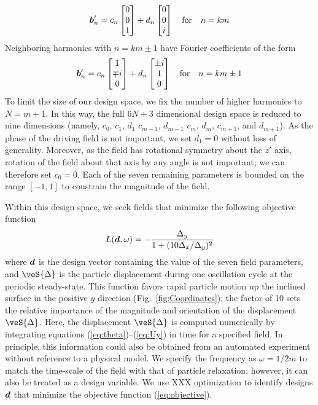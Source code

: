 \begin{equation}
    \boldsymbol{b}'_{n} = c_{n} \begin{bmatrix} 0\\0\\1 \end{bmatrix} + d_{n} \begin{bmatrix} 0\\0\\i \end{bmatrix} \quad \text{for} \quad n=km
\end{equation}
Neighboring harmonics with $n=km\pm 1$ have Fourier coefficients of the form
\begin{equation}
    \boldsymbol{b}'_{n} = c_{n} \begin{bmatrix} 1\\\mp i \\0\end{bmatrix} + d_{n} \begin{bmatrix} \pm i\\1\\0 \end{bmatrix} \quad \text{for} \quad n=km \pm 1
\end{equation}
To limit the size of our design space, we fix the number of higher harmonics to $N=m+1$. In this way, the full $6N+3$ dimensional design space is reduced to nine dimensions (namely, $c_0$, $c_1$, $d_1$ $c_{m-1}$, $d_{m-1}$ $c_{m}$, $d_{m}$, $c_{m+1}$, and $d_{m+1}$). As the phase of the driving field is not important, we set $d_1=0$ without loss of generality. Moreover, as the field has rotational symmetry about the $z'$ axis, rotation of the field about that axis by any angle is not important; we can therefore set $c_{0}=0$. Each of the seven remaining parameters is bounded on the range $[-1,1]$ to constrain the magnitude of the field. 

Within this design space, we seek fields that minimize the following objective function
\begin{equation}
    L(\boldsymbol{d},\omega) = -\frac{\Delta_y}{1 + (10 \Delta_x/\Delta_y)^2} \label{eq:objective}
\end{equation}
where $\boldsymbol{d}$ is the design vector containing the value of the seven field parameters, and $\veS{\Delta}$ is the particle displacement during one oscillation cycle at the periodic steady-state.  This function favors rapid particle motion up the inclined surface in the positive $y$ direction (Fig.~\ref{fig:Coordinates}); the factor of 10 sets the relative importance of the magnitude and orientation of the displacement $\veS{\Delta}$. Here, the displacement $\veS{\Delta}$ is computed numerically by integrating equations (\ref{eq:theta})--(\ref{eq:Uy}) in time for a specified field. In principle, this information could also be obtained from an automated experiment without reference to a physical model. We specify the frequency as $\omega=1/2 m$ to match the time-scale of the field with that of particle relaxation; however, it can also be treated as a design variable.  We use XXX optimization to identify designs $\boldsymbol{d}$ that minimize the objective function (\ref{eq:objective}).

